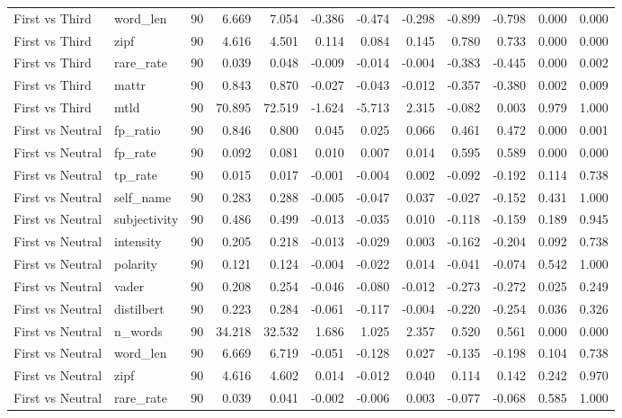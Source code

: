 \documentclass[10pt]{article}
\begin{document}
{\begin{longtable}{llrrrrrrrrrr}
First vs Third & word\_len & 90 & 6.669 & 7.054 & -0.386 & -0.474 & -0.298 & -0.899 & -0.798 & 0.000 & 0.000 \\
First vs Third & zipf & 90 & 4.616 & 4.501 & 0.114 & 0.084 & 0.145 & 0.780 & 0.733 & 0.000 & 0.000 \\
First vs Third & rare\_rate & 90 & 0.039 & 0.048 & -0.009 & -0.014 & -0.004 & -0.383 & -0.445 & 0.000 & 0.002 \\
First vs Third & mattr & 90 & 0.843 & 0.870 & -0.027 & -0.043 & -0.012 & -0.357 & -0.380 & 0.002 & 0.009 \\
First vs Third & mtld & 90 & 70.895 & 72.519 & -1.624 & -5.713 & 2.315 & -0.082 & 0.003 & 0.979 & 1.000 \\
First vs Neutral & fp\_ratio & 90 & 0.846 & 0.800 & 0.045 & 0.025 & 0.066 & 0.461 & 0.472 & 0.000 & 0.001 \\
First vs Neutral & fp\_rate & 90 & 0.092 & 0.081 & 0.010 & 0.007 & 0.014 & 0.595 & 0.589 & 0.000 & 0.000 \\
First vs Neutral & tp\_rate & 90 & 0.015 & 0.017 & -0.001 & -0.004 & 0.002 & -0.092 & -0.192 & 0.114 & 0.738 \\
First vs Neutral & self\_name & 90 & 0.283 & 0.288 & -0.005 & -0.047 & 0.037 & -0.027 & -0.152 & 0.431 & 1.000 \\
First vs Neutral & subjectivity & 90 & 0.486 & 0.499 & -0.013 & -0.035 & 0.010 & -0.118 & -0.159 & 0.189 & 0.945 \\
First vs Neutral & intensity & 90 & 0.205 & 0.218 & -0.013 & -0.029 & 0.003 & -0.162 & -0.204 & 0.092 & 0.738 \\
First vs Neutral & polarity & 90 & 0.121 & 0.124 & -0.004 & -0.022 & 0.014 & -0.041 & -0.074 & 0.542 & 1.000 \\
First vs Neutral & vader & 90 & 0.208 & 0.254 & -0.046 & -0.080 & -0.012 & -0.273 & -0.272 & 0.025 & 0.249 \\
First vs Neutral & distilbert & 90 & 0.223 & 0.284 & -0.061 & -0.117 & -0.004 & -0.220 & -0.254 & 0.036 & 0.326 \\
First vs Neutral & n\_words & 90 & 34.218 & 32.532 & 1.686 & 1.025 & 2.357 & 0.520 & 0.561 & 0.000 & 0.000 \\
First vs Neutral & word\_len & 90 & 6.669 & 6.719 & -0.051 & -0.128 & 0.027 & -0.135 & -0.198 & 0.104 & 0.738 \\
First vs Neutral & zipf & 90 & 4.616 & 4.602 & 0.014 & -0.012 & 0.040 & 0.114 & 0.142 & 0.242 & 0.970 \\
First vs Neutral & rare\_rate & 90 & 0.039 & 0.041 & -0.002 & -0.006 & 0.003 & -0.077 & -0.068 & 0.585 & 1.000 \\

\end{longtable}}
\end{document}

